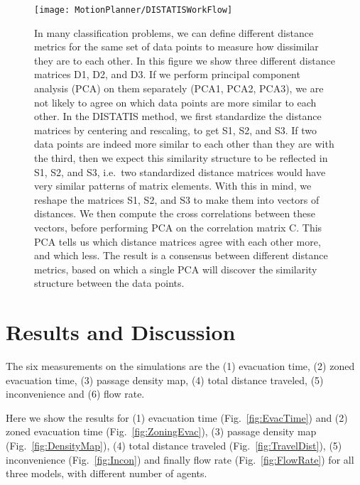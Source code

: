 \begin{figure}[!tbp]
\centering
\texttt{[image: MotionPlanner/DISTATISWorkFlow]}
\caption[Visualization of DISTATIS workflow]{In many classification problems, we can define different distance metrics for the same set of data points to measure how dissimilar they are to each other. In this figure we show three different distance matrices D1, D2, and D3. If we perform principal component analysis (PCA) on them separately (PCA1, PCA2, PCA3), we are not likely to agree on which data points are more similar to each other. In the DISTATIS method, we first standardize the distance matrices by centering and rescaling, to get S1, S2, and S3. If two data points are indeed more similar to each other than they are with the third, then we expect this similarity structure to be reflected in S1, S2, and S3, i.e.~two standardized distance matrices would have very similar patterns of matrix elements. With this in mind, we reshape the matrices S1, S2, and S3 to make them into vectors of distances. We then compute the cross correlations between these vectors, before performing PCA on the correlation matrix C. This PCA tells us which distance matrices agree with each other more, and which less. The result is a consensus between different distance metrics, based on which a single PCA will discover the similarity structure between the data points.}
\label{fig:DISTATIS}
\end{figure}

\section{Results and Discussion}
\label{Discussion}

The six measurements on the simulations are the (1) evacuation time, (2) zoned evacuation time, (3) passage density map, (4) total distance traveled, (5) inconvenience and (6) flow rate.

Here we show the results for (1) evacuation time (Fig.~\ref{fig:EvacTime}) and (2) zoned evacuation time (Fig.~\ref{fig:ZoningEvac}), (3) passage density map (Fig.~\ref{fig:DensityMap}), (4) total distance traveled (Fig.~\ref{fig:TravelDist}), (5) inconvenience (Fig.~\ref{fig:Incon}) and finally flow rate (Fig.~\ref{fig:FlowRate}) for all three models, with different number of agents.


